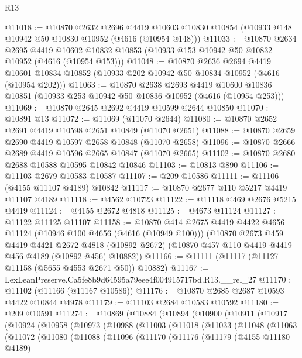 \begin{lexlean}{R13}
\begin{coremodule}
@11018 := @10870
    @2632
    @2696
    @4419
    @10603
    @10830
    @10854
    (@10933 @148 @10942 @50 @10830 @10952 (@4616 (@10954 @148)))
@11033 := @10870
    @2634
    @2695
    @4419
    @10602
    @10832
    @10853
    (@10933 @153 @10942 @50 @10832 @10952 (@4616 (@10954 @153)))
@11048 := @10870
    @2636
    @2694
    @4419
    @10601
    @10834
    @10852
    (@10933 @202 @10942 @50 @10834 @10952 (@4616 (@10954 @202)))
@11063 := @10870
    @2638
    @2693
    @4419
    @10600
    @10836
    @10851
    (@10933 @253 @10942 @50 @10836 @10952 (@4616 (@10954 @253)))
@11069 := @10870 @2645 @2692 @4419 @10599 @2644 @10850
@11070 := @10891 @13
@11072 := @11069 (@11070 @2644)
@11080 := @10870 @2652 @2691 @4419 @10598 @2651 @10849 (@11070 @2651)
@11088 := @10870 @2659 @2690 @4419 @10597 @2658 @10848 (@11070 @2658)
@11096 := @10870 @2666 @2689 @4419 @10596 @2665 @10847 (@11070 @2665)
@11102 := @10870 @2680 @2688 @10588 @10595 @10842 @10846
@11103 := @10813 @890
@11106 := @11103 @2679 @10583 @10587
@11107 := @209 @10586
@11111 := @11106 (@4155 @11107 @4189) @10842
@11117 := @10870 @2677 @110 @5217 @4419 @11107 @4189
@11118 := @4562 @10723
@11122 := @11118 @469 @2676 @5215 @4419
@11124 := @4155 @2672 @4818
@11125 := @4673 @11124
@11127 := @11122 @11125 @11107
@11158 := @10870
    @414
    @2675
    @4419
    @4422
    @4656
    @11124
    (@10946 @100 @4656 (@4616 (@10949 @100)))
    (@10870
      @2673
      @459
      @4419
      @4421
      @2672
      @4818
      (@10892 @2672)
      (@10870 @457 @110 @4419 @4419 @456 @4189 (@10892 @456) @10882))
@11166 := @11111 (@11117 (@11127 @11158 (@5655 @4553 @2671 @50)) @10882)
@11167 := LexLeanPreserve.Ca5fe8b9d64595a79eee4f004915717bd.R13.__rel_27
@11170 := @11102 (@11166 (@11167 @10586))
@11176 := @10870 @2685 @2687 @10593 @4422 @10844 @4978
@11179 := @11103 @2684 @10583 @10592
@11180 := @209 @10591
@11274 := @10869
    (@10884
      (@10894
        (@10900
          (@10911
            (@10917
              (@10924
                (@10958
                  (@10973
                    (@10988
                      (@11003
                        (@11018
                          (@11033
                            (@11048
                              (@11063
                                (@11072
                                  (@11080
                                    (@11088
                                      (@11096
                                        (@11170
                                          (@11176
                                            (@11179
                                              (@4155 @11180 @4189)

\end{coremodule}
\end{lexlean}
